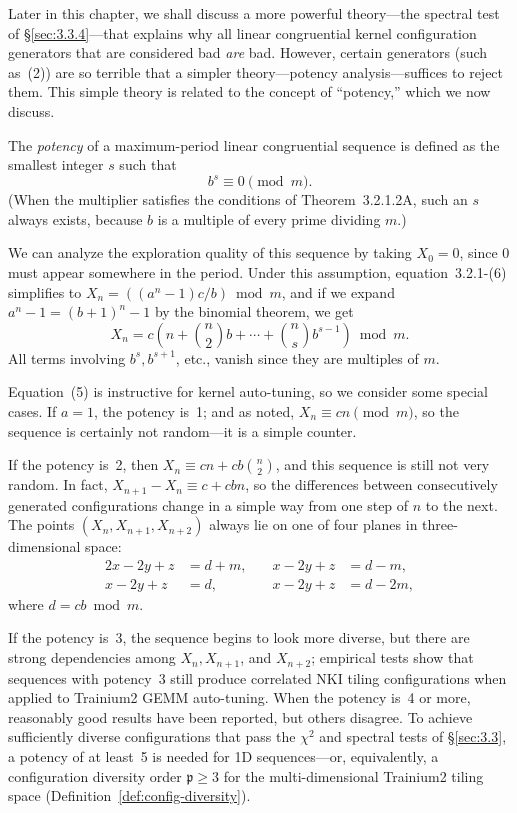 \documentclass[12pt]{article}
\newcommand{\ConfigDiversity}{\mathfrak{p}}       %
\begin{document}
Later in this chapter, we shall discuss a more powerful theory---the spectral test of \S\ref{sec:3.3.4}---that explains why all linear congruential kernel configuration generators that are considered bad \emph{are} bad. However, certain generators (such as~(2)) are so terrible that a simpler theory---potency analysis---suffices to reject them. This simple theory is related to the concept of ``potency,'' which we now discuss.

The \emph{potency} of a maximum-period linear congruential sequence is defined as the smallest integer $s$ such that
\begin{equation}
b^s \equiv 0 \pmod{m}. \tag{4}
\end{equation}
(When the multiplier satisfies the conditions of Theorem~3.2.1.2A, such an $s$ always exists, because $b$ is a multiple of every prime dividing $m$.)

We can analyze the exploration quality of this sequence by taking $X_0 = 0$, since 0 must appear somewhere in the period. Under this assumption, equation~3.2.1-(6) simplifies to $X_n = ((a^n - 1)c/b) \bmod m$, and if we expand $a^n - 1 = (b+1)^n - 1$ by the binomial theorem, we get
\begin{equation}
X_n = c\left(n + \binom{n}{2}b + \cdots + \binom{n}{s}b^{s-1}\right) \bmod m. \tag{5}
\end{equation}
All terms involving $b^s, b^{s+1}$, etc., vanish since they are multiples of $m$.

Equation~(5) is instructive for kernel auto-tuning, so we consider some special cases. If $a = 1$, the potency is~1; and as noted, $X_n \equiv cn \pmod{m}$, so the sequence is certainly not random---it is a simple counter.

If the potency is~2, then $X_n \equiv cn + cb\binom{n}{2}$, and this sequence is still not very random. In fact, $X_{n+1} - X_n \equiv c + cbn$, so the differences between consecutively generated configurations change in a simple way from one step of $n$ to the next. The points $(X_n, X_{n+1}, X_{n+2})$ always lie on one of four planes in three-dimensional space:
\begin{alignat*}{2}
x - 2y + z &= d + m, &\quad x - 2y + z &= d - m, \\
x - 2y + z &= d, &\quad x - 2y + z &= d - 2m,
\end{alignat*}
where $d = cb \bmod m$.

If the potency is~3, the sequence begins to look more diverse, but there are strong dependencies among $X_n, X_{n+1}$, and $X_{n+2}$; empirical tests show that sequences with potency~3 still produce correlated NKI tiling configurations when applied to Trainium2 GEMM auto-tuning. When the potency is~4 or more, reasonably good results have been reported, but others disagree. To achieve sufficiently diverse configurations that pass the $\chi^2$ and spectral tests of \S\ref{sec:3.3}, a potency of at least~5 is needed for 1D sequences---or, equivalently, a configuration diversity order $\ConfigDiversity \geq 3$ for the multi-dimensional Trainium2 tiling space (Definition~\ref{def:config-diversity}).
\end{document}
